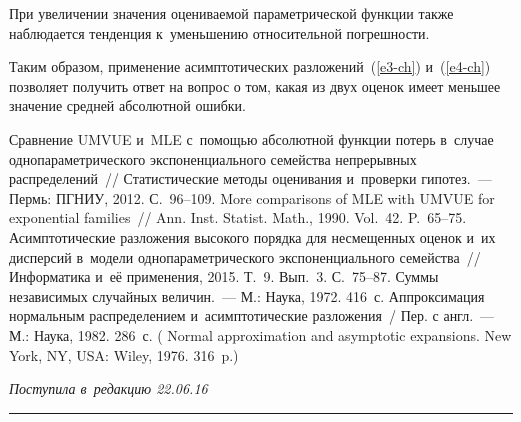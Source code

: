 \begin{multicols}{2}
 При увеличении значения оцениваемой параметрической функции также наблюдается
 тенденция к~уменьшению относительной погрешности.

 Таким образом, применение асимптотических разложений~(\ref{e3-ch}) и~(\ref{e4-ch}) 
 позволяет получить  ответ на вопрос о том, какая из двух оценок имеет меньшее значение 
 средней  абсолютной ошибки.
 


{\small\frenchspacing
 {%
 \begin{thebibliography}{9}

 Сравнение UMVUE и~MLE с~по\-мощью
  абсолютной функции потерь в~случае однопараметрического экспоненциального 
  семейства непрерывных распределений~// Статистические методы оценивания 
  и~проверки гипотез.~--- Пермь: ПГНИУ, 2012. С.~96--109.
  More comparisons of MLE with UMVUE
  for exponential families~// Ann. Inst. Statist. Math., 1990. Vol.~42. P.~65--75.
  Асимптотические разложения высокого порядка для
  несмещенных оценок и~их дисперсий в~модели однопараметрического 
  экспоненциального семейства~// Информатика и~её 
  применения, 2015. Т.~9. Вып.~3. С.~75--87.
  Суммы независимых случайных величин.~---
  М.: Наука, 1972. 416~с.
  Аппроксимация нормальным распределением и~асимптотические разложения~/
  Пер. с англ.~--- 
  М.: Наука, 1982. 286~с.
  (
{Normal approximation and asymptotic expansions}. 
New York, NY, USA: Wiley, 1976. 316~p.)
  \end{thebibliography}

 }
 }

\end{multicols}

\vspace*{-3pt}

\hfill{\small\textit{Поступила в~редакцию 22.06.16}}

\vspace*{10pt}



\hrule

\vspace*{2pt}

